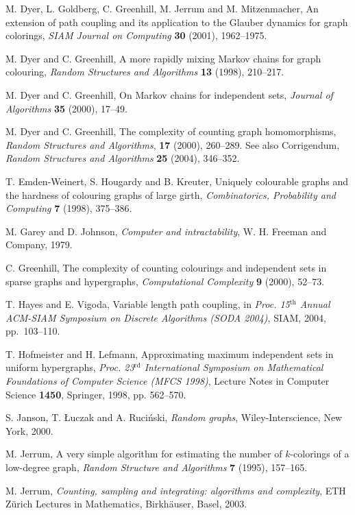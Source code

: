 \documentclass[11pt]{article}
\theoremstyle{definition}
\theoremstyle{remark}
\begin{document}
\begin{thebibliography}{99}
 M. Dyer, L. Goldberg, C. Greenhill,
M. Jerrum and M. Mitzenmacher, An extension of path coupling and its
application to the Glauber dynamics for graph colorings,  \emph{SIAM
Journal on Computing} \textbf{30} (2001), 1962--1975.

 M. Dyer and C. Greenhill, A more rapidly mixing Markov
chains for graph colouring, \emph{Random Structures and Algorithms}
\textbf{13} (1998), 210--217.

 M. Dyer and C. Greenhill, On Markov chains for independent
sets, \emph{Journal of Algorithms} \textbf{35} (2000), 17--49.

 M. Dyer and C. Greenhill, The complexity of counting graph
homomorphisms, \emph{Random Structures and Algorithms}, \textbf{17} (2000), 260--289.
See also Corrigendum, \emph{Random Structures and Algorithms} \textbf{25} (2004), 346--352.

 T. Emden-Weinert, S. Hougardy and B. Kreuter,
Uniquely colourable graphs and the hardness of colouring graphs of large girth,
\emph{Combinatorics, Probability and Computing} \textbf{7} (1998), 375--386.

 M. Garey and D. Johnson, \emph{Computer and intractability},
W. H. Freeman and Company, 1979.

 C. Greenhill, The complexity of counting colourings and
independent sets in sparse graphs and hypergraphs, \emph{Computational Complexity}
\textbf{9} (2000), 52--73.

T. Hayes and E. Vigoda, Variable length path coupling, in \emph{Proc.
15${}^\textrm{th}$ Annual ACM-SIAM Symposium on Discrete Algorithms (SODA
2004)}, SIAM, 2004, pp.~103--110.

 T. Hofmeister and H. Lefmann, Approximating maximum
independent sets in uniform hypergraphs, \emph{Proc. 23${}^\textrm{rd}$
International Symposium on Mathematical Foundations of Computer Science
(MFCS 1998)}, Lecture Notes in Computer Science \textbf{1450}, Springer,
1998, pp. 562--570.

 S. Janson, T. \L uczak and A. Ruci\'nski, \emph{Random graphs},
Wiley-Interscience, New York, 2000.

 M. Jerrum, A very simple algorithm for estimating the number of
$k$-colorings of a low-degree graph, \emph{Random Structure and Algorithms}
\textbf{7} (1995), 157--165.

 M. Jerrum, \emph{Counting, sampling and integrating: algorithms and
complexity}, ETH Z\"urich Lectures in Mathematics, Birkh\"auser, Basel,
2003.


\end{thebibliography}
\end{document}
